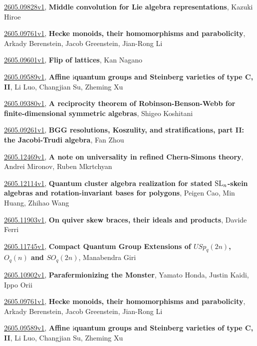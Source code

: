\documentclass[9pt, a4paper]{article}
\theoremstyle{plain}
\theoremstyle{definition}
\theoremstyle{remark}
\newcommand{\arxiv}[3]{\href{https://arxiv.org/abs/#1}{#1}, \textbf{\textcolor{arxivblue}{#2}}, #3}
\begin{document}
\arxiv{2605.09828v1}{Middle convolution for Lie algebra representations}{Kazuki Hiroe}

\arxiv{2605.09761v1}{Hecke monoids, their homomorphisms and parabolicity}{Arkady Berenstein, Jacob Greenstein, Jian-Rong Li}

\arxiv{2605.09601v1}{Flip of lattices}{Kan Nagano}

\arxiv{2605.09589v1}{Affine $\mathrm{i}$quantum groups and Steinberg varieties of type C, II}{Li Luo, Changjian Su, Zheming Xu}

\arxiv{2605.09380v1}{A reciprocity theorem of Robinson-Benson-Webb for finite-dimensional symmetric algebras}{Shigeo Koshitani}

\arxiv{2605.09261v1}{BGG resolutions, Koszulity, and stratifications, part II: the Jacobi-Trudi algebra}{Fan Zhou}

\arxiv{2605.12469v1}{A note on universality in refined Chern-Simons theory}{Andrei Mironov, Ruben Mkrtchyan}

\arxiv{2605.12114v1}{Quantum cluster algebra realization for stated ${\rm SL}_n$-skein algebras and rotation-invariant bases for polygons}{Peigen Cao, Min Huang, Zhihao Wang}

\arxiv{2605.11903v1}{On quiver skew braces, their ideals and products}{Davide Ferri}

\arxiv{2605.11745v1}{Compact Quantum Group Extensions of $USp_q(2n)$, $O_q(n)$ and $SO_q(2n)$}{Manabendra Giri}

\arxiv{2605.10902v1}{Parafermionizing the Monster}{Yamato Honda, Justin Kaidi, Ippo Orii}

\arxiv{2605.09761v1}{Hecke monoids, their homomorphisms and parabolicity}{Arkady Berenstein, Jacob Greenstein, Jian-Rong Li}

\arxiv{2605.09589v1}{Affine $\mathrm{i}$quantum groups and Steinberg varieties of type C, II}{Li Luo, Changjian Su, Zheming Xu}

\end{document}
